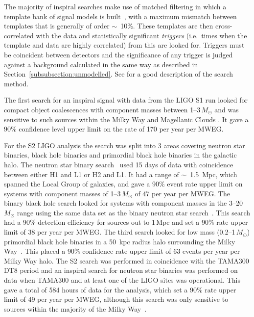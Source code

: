 \documentclass{article}
\begin{document}
The majority of inspiral searches make use of matched filtering in which a
template bank of signal models is built~\cite{Owen:1996, Owen:1999}, with a
maximum mismatch between templates that is generally of order $\sim$~10\%. These
templates are then cross-correlated with the data and statistically significant
\textit{triggers} (i.e.\ times when the template and data are highly correlated)
from this are looked for. Triggers must be coincident between detectors and the
significance of any trigger is judged against a background calculated in the
same way as described in Section~\ref{subsubsection:unmodelled}. See
\cite{Abbott:2005b} for a good description of the search method.

The first search for an inspiral signal with data from the LIGO S1 run looked
for compact object coalescences with component masses between 1--3\,$M_{\odot}$
and was sensitive to such sources within the Milky Way and Magellanic Clouds
\cite{Abbott:2004c}. It gave a 90\% confidence level upper limit on the rate of
170 per year per MWEG.

For the S2 LIGO analysis the search was split into 3 areas covering neutron star
binaries, black hole binaries and primordial black hole binaries in the galactic
halo. The neutron star binary search~\cite{Abbott:2005b} used 15 days of data
with coincidence between either H1 and L1 or H2 and L1. It had a range of
$\sim$~1.5~Mpc, which spanned the Local Group of galaxies, and gave a 90\% event
rate upper limit on systems with component masses of 1--3\,$M_{\odot}$ of 47 per
year per MWEG. The binary black hole search looked for systems with component
masses in the 3--20\,$M_{\odot}$ range using the same data set as the binary
neutron star search~\cite{Abbott:2006a}. This search had a 90\% detection
efficiency for sources out to 1\,Mpc and set a 90\% rate upper limit of 38 per
year per MWEG. The third search looked for low mass (0.2--1\,$M_{\odot}$)
primordial black hole binaries in a 50~kpc radius halo surrounding the Milky
Way~\cite{Abbott:2005e}. This placed a 90\% confidence rate upper limit of 63
events per year per Milky Way halo. The S2 search was performed in coincidence
with the TAMA300 DT8 period and an inspiral search for neutron star binaries
was
performed on data when TAMA300 and at least one of the LIGO sites was
operational. This gave a total of 584 hours of data for the analysis, which set
a 90\% rate upper limit of 49 per year per MWEG, although this search was only
sensitive to sources within the majority of the Milky Way~\cite{Abbott:2006b}.
\end{document}
